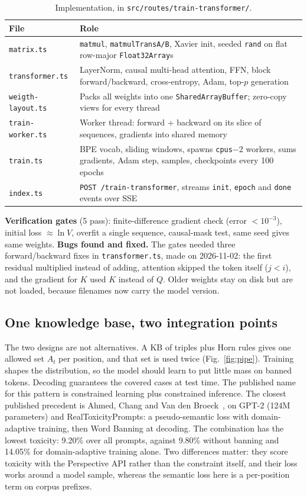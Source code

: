 \documentclass[letterpaper, 10pt, conference]{IEEEtran}
\begin{document}
\begin{table}[t]
\caption{Implementation, in \texttt{src/routes/train-transformer/}.}\label{tab:impl}
\centering\footnotesize\setlength{\tabcolsep}{3pt}
\begin{tabular}{@{}>{\scriptsize}L{2.4cm}L{5.9cm}@{}}
\toprule
File & Role\\
\midrule
\texttt{matrix.ts} & \texttt{matmul}, \texttt{matmulTransA/B}, Xavier init, seeded \texttt{rand} on flat row-major \texttt{Float32Array}s\\
\texttt{transformer.ts} & LayerNorm, causal multi-head attention, FFN, block forward/backward, cross-entropy, Adam, top-$p$ generation\\
\texttt{weigth-layout.ts} & Packs all weights into one \texttt{Shared\-Array\-Buffer}; zero-copy views for every thread\\
\texttt{train-worker.ts} & Worker thread: forward + backward on its slice of sequences, gradients into shared memory\\
\texttt{train.ts} & BPE vocab, sliding windows, spawns \texttt{cpus}$-$2 workers, sums gradients, Adam step, samples, checkpoints every 100 epochs\\
\texttt{index.ts} & \texttt{POST /train-transformer}, streams \texttt{init}, \texttt{epoch} and \texttt{done} events over SSE\\
\bottomrule
\end{tabular}
\end{table}

\textbf{Verification gates} (5 pass): finite-difference gradient check (error $<10^{-3}$), initial loss $\approx\ln V$, overfit a single sequence, causal-mask test, same seed gives same weights. \textbf{Bugs found and fixed.} The gates needed three forward/backward fixes in \texttt{transformer.ts}, made on 2026-11-02: the first residual multiplied instead of adding, attention skipped the token itself ($j<i$), and the gradient for $K$ used $K$ instead of $Q$. Older weights stay on disk but are not loaded, because filenames now carry the model version.

\subsection{One knowledge base, two integration points}
The two designs are not alternatives. A KB of triples plus Horn rules gives one allowed set $A_t$ per position, and that set is used twice (Fig.~\ref{fig:pipe}). Training shapes the distribution, so the model should learn to put little mass on banned tokens. Decoding guarantees the covered cases at test time. The published name for this pattern is constrained learning plus constrained inference. The closest published precedent is Ahmed, Chang and Van den Broeck~\cite{ahmed2023}, on GPT-2 (124M parameters) and RealToxicityPrompts: a pseudo-semantic loss with domain-adaptive training, then Word Banning at decoding. The combination has the lowest toxicity: 9.20\% over all prompts, against 9.80\% without banning and 14.05\% for domain-adaptive training alone. Two differences matter: they score toxicity with the Perspective API rather than the constraint itself, and their loss works around a model sample, whereas the semantic loss here is a per-position term on corpus prefixes.
\end{document}
